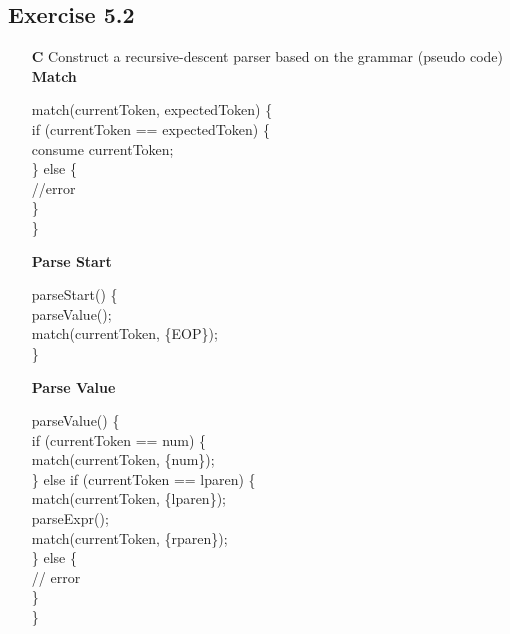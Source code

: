 \documentclass[letterpaper, 10pt,DIV=13]{scrartcl}
\numberwithin{equation}{section} %
\numberwithin{figure}{section} %
\numberwithin{table}{section} %
\begin{document}
\subsection*{Exercise 5.2}
\begin{enumerate}[label=\textbf{\Alph*}]
Grammar suitable for LL(1) parsing:
\begin{lstlisting}[]
Start  -> Value $
Value  -> num
        | lparen Expr rparen
Expr   -> plus Value Value
        | prod Values
Values -> Value Values
        | (*@ $\lambda$ @*)
\end{lstlisting}

\item[\textbf C] Construct a recursive-descent parser based on the grammar (pseudo code) \\

\textbf{Match} \\
\begin{algorithm}[H]
	\SetAlgoLined   
	match(currentToken, expectedToken) \{ \\
		\Indp
		if (currentToken == expectedToken) \{ \\
			\Indp
			consume currentToken; \\
			\Indm		
		\} else \{ \\
			\Indp
			//error \\
			\Indm
		\} \\
		\Indm
	\} \\
\end{algorithm}

\textbf{Parse Start} \\
\begin{algorithm}[H]
	\SetAlgoLined   
	parseStart() \{ \\
		\Indp
		parseValue(); \\
		match(currentToken, \{EOP\}); \\
		\Indm
	\} \\
\end{algorithm}

\pagebreak

\textbf{Parse Value} \\
\begin{algorithm}[H]
	\SetAlgoLined   
	parseValue() \{ \\
		\Indp
		if (currentToken == num) \{ \\
			\Indp
			match(currentToken, \{num\}); \\
			\Indm		
		\} else if (currentToken == lparen) \{ \\
			\Indp
			match(currentToken, \{lparen\}); \\
			parseExpr(); \\
			match(currentToken, \{rparen\}); \\
			\Indm
		\} else \{ \\
			\Indp
			// error \\
			\Indm
		\} \\
		\Indm
	\} \\
\end{algorithm}


\end{enumerate}
\end{document}
